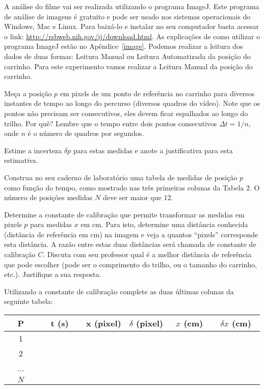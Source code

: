 A análise do filme vai ser realizada utilizando o programa ImageJ.  Este programa de análise de imagens é gratuito e pode ser usado nos sistemas operacionais do Windows, Mac e Linux. Para baixá-lo e instalar no seu computador basta acessar o link: \url{http://rsbweb.nih.gov/ij/download.html}.
As explicações de como utilizar o programa ImageJ estão no Apêndice~\ref{image}. Podemos realizar a leitura dos dados de duas formas: Leitura Manual ou Leitura Automatizada da posição do carrinho. Para este experimento vamos realizar a Leitura Manual da posição do carrinho.

\begin{num}
\item Meça a posição $p$ em pixels de um ponto de referência no carrinho para diversos instantes de tempo ao longo do percurso (diversos quadros do vídeo). Note que os pontos não precisam ser consecutivos, eles devem ficar espalhados ao longo do trilho. Por quê? Lembre que o tempo entre dois pontos consecutivos $\Delta t = 1/n$, onde $n$ é o número de quadros por segundos. 
\item Estime a incerteza $\delta p$ para estas medidas e anote a justificativa para esta estimativa.
\item Construa no seu caderno de laboratório uma tabela de medidas de posição $p$ como função do tempo, como mostrado nas três primeiras colunas da Tabela 2. O número de posições medidas $N$ deve ser maior que 12.  
\item Determine a constante de calibração que permite transformar as medidas em pixels $p$ para medidas $x$ em cm. Para isto, determine uma distância conhecida (distância de referência em cm) na imagem e veja a quantos “pixels” corresponde esta distância. A razão entre estas duas distâncias será chamada de constante de calibração $C$. Discuta com seu professor qual é a melhor distância de referência que pode escolher (pode ser o comprimento do trilho, ou o tamanho do carrinho, etc.). Justifique a sua resposta. 
\item Utilizando a constante de calibração complete as duas últimas colunas da seguinte tabela:

\begin{table}[h]
\begin{center}
  \begin{tabular}[m]{ | c | c | c | c | c | c |} \hline	
    ~~P~~ & ~~t (s)~~ & x (pixel) & $\delta$ (pixel) & ~$x$ (cm)~ & ~$\delta x$ (cm)~ \\ \hline
    1 &	&	&	&	&		\\ \hline
    2 &	&	&	&	&	 	\\ \hline
    ... &	&	&	&	&		\\ \hline
    $N$	&	&	&	&	&	\\ \hline
  \end{tabular}
\end{center}
\end{table}


\end{num}
